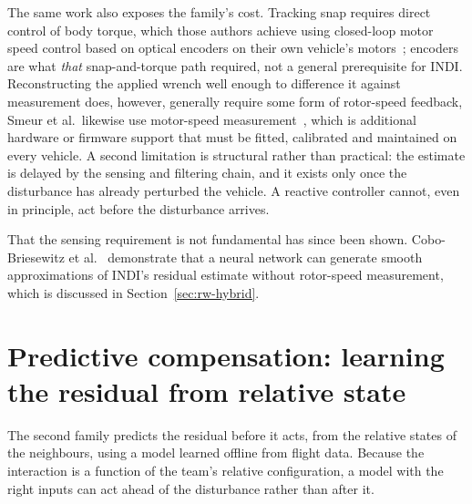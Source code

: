 The same work also exposes the family's cost. Tracking snap requires direct control of body torque,
which those authors achieve using closed-loop motor speed control based on optical encoders on
their own vehicle's motors~\cite{tal2018indi}; encoders are what \emph{that} snap-and-torque path
required, not a general prerequisite for INDI. Reconstructing the applied wrench well enough to
difference it against measurement does, however, generally require some form of rotor-speed
feedback, Smeur et al.\ likewise use motor-speed
measurement~\cite{smeur2017cascadedindi}, which is additional hardware or firmware support that
must be fitted, calibrated and maintained on every vehicle. A second limitation is structural rather than
practical: the estimate is delayed by the sensing and filtering chain, and it exists only once the
disturbance has already perturbed the vehicle. A reactive controller cannot, even in principle, act
before the disturbance arrives.

That the sensing requirement is not fundamental has since been shown. Cobo-Briesewitz et
al.~\cite{cobobriesewitz2026lindi} demonstrate that a neural network can generate smooth
approximations of INDI's residual estimate without rotor-speed measurement, which is discussed in Section~\ref{sec:rw-hybrid}.

\section{Predictive compensation: learning the residual from relative state}
\label{sec:rw-predictive}

The second family predicts the residual before it acts, from the relative states of the
neighbours, using a model learned offline from flight data. Because the interaction is a function
of the team's relative configuration, a model with the right inputs can act ahead of the
disturbance rather than after it.

